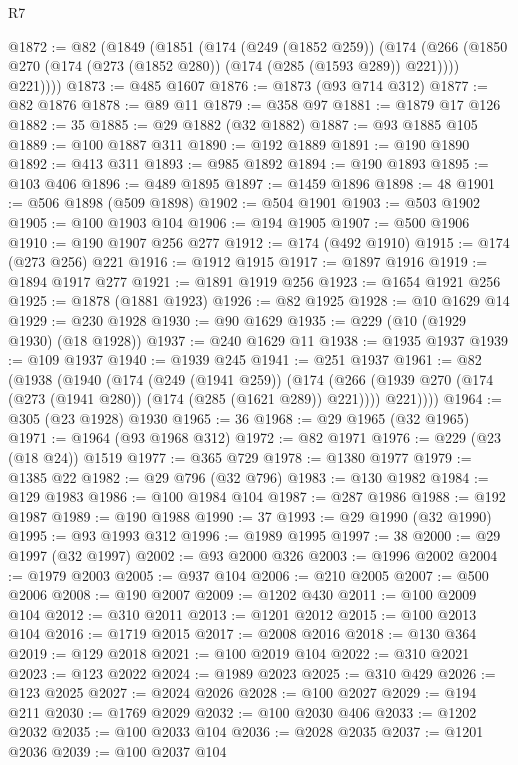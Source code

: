 \begin{lexlean}{R7}
\begin{coremodule}
@1872 := @82
    (@1849
      (@1851
        (@174
          (@249 (@1852 @259))
          (@174
            (@266 (@1850 @270 (@174 (@273 (@1852 @280)) (@174 (@285 (@1593 @289)) @221))))
            @221))))
@1873 := @485 @1607
@1876 := @1873 (@93 @714 @312)
@1877 := @82 @1876
@1878 := @89 @11
@1879 := @358 @97
@1881 := @1879 @17 @126
@1882 := 35
@1885 := @29 @1882 (@32 @1882)
@1887 := @93 @1885 @105
@1889 := @100 @1887 @311
@1890 := @192 @1889
@1891 := @190 @1890
@1892 := @413 @311
@1893 := @985 @1892
@1894 := @190 @1893
@1895 := @103 @406
@1896 := @489 @1895
@1897 := @1459 @1896
@1898 := 48
@1901 := @506 @1898 (@509 @1898)
@1902 := @504 @1901
@1903 := @503 @1902
@1905 := @100 @1903 @104
@1906 := @194 @1905
@1907 := @500 @1906
@1910 := @190 @1907 @256 @277
@1912 := @174 (@492 @1910)
@1915 := @174 (@273 @256) @221
@1916 := @1912 @1915
@1917 := @1897 @1916
@1919 := @1894 @1917 @277
@1921 := @1891 @1919 @256
@1923 := @1654 @1921 @256
@1925 := @1878 (@1881 @1923)
@1926 := @82 @1925
@1928 := @10 @1629 @14
@1929 := @230 @1928
@1930 := @90 @1629
@1935 := @229 (@10 (@1929 @1930) (@18 @1928))
@1937 := @240 @1629 @11
@1938 := @1935 @1937
@1939 := @109 @1937
@1940 := @1939 @245
@1941 := @251 @1937
@1961 := @82
    (@1938
      (@1940
        (@174
          (@249 (@1941 @259))
          (@174
            (@266 (@1939 @270 (@174 (@273 (@1941 @280)) (@174 (@285 (@1621 @289)) @221))))
            @221))))
@1964 := @305 (@23 @1928) @1930
@1965 := 36
@1968 := @29 @1965 (@32 @1965)
@1971 := @1964 (@93 @1968 @312)
@1972 := @82 @1971
@1976 := @229 (@23 (@18 @24)) @1519
@1977 := @365 @729
@1978 := @1380 @1977
@1979 := @1385 @22
@1982 := @29 @796 (@32 @796)
@1983 := @130 @1982
@1984 := @129 @1983
@1986 := @100 @1984 @104
@1987 := @287 @1986
@1988 := @192 @1987
@1989 := @190 @1988
@1990 := 37
@1993 := @29 @1990 (@32 @1990)
@1995 := @93 @1993 @312
@1996 := @1989 @1995
@1997 := 38
@2000 := @29 @1997 (@32 @1997)
@2002 := @93 @2000 @326
@2003 := @1996 @2002
@2004 := @1979 @2003
@2005 := @937 @104
@2006 := @210 @2005
@2007 := @500 @2006
@2008 := @190 @2007
@2009 := @1202 @430
@2011 := @100 @2009 @104
@2012 := @310 @2011
@2013 := @1201 @2012
@2015 := @100 @2013 @104
@2016 := @1719 @2015
@2017 := @2008 @2016
@2018 := @130 @364
@2019 := @129 @2018
@2021 := @100 @2019 @104
@2022 := @310 @2021
@2023 := @123 @2022
@2024 := @1989 @2023
@2025 := @310 @429
@2026 := @123 @2025
@2027 := @2024 @2026
@2028 := @100 @2027
@2029 := @194 @211
@2030 := @1769 @2029
@2032 := @100 @2030 @406
@2033 := @1202 @2032
@2035 := @100 @2033 @104
@2036 := @2028 @2035
@2037 := @1201 @2036
@2039 := @100 @2037 @104

\end{coremodule}
\end{lexlean}

